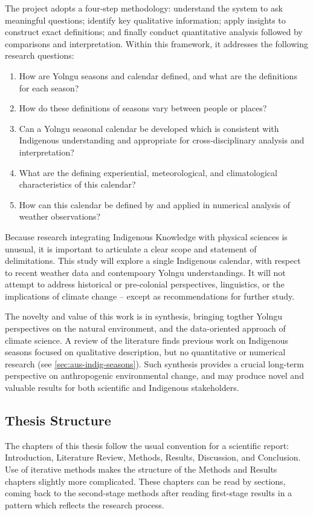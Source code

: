 The project adopts a four-step methodology:  understand the system to ask
meaningful questions; identify key qualitative information; apply insights to
construct exact definitions; and finally conduct quantitative analysis
followed by comparisons and interpretation.  Within this framework, it
addresses the following research questions:
\begin{enumerate}
\item How are Yolngu seasons and calendar defined, and what are the definitions for each season?
\item How do these definitions of seasons vary between people or places?
\item Can a Yolngu seasonal calendar be developed which is consistent with Indigenous
    understanding and appropriate for cross-disciplinary analysis and interpretation?
\item What are the defining experiential, meteorological, and climatological
    characteristics of this calendar?
\item How can this calendar be defined by and applied in numerical analysis of weather observations?
\end{enumerate}

Because research integrating Indigenous Knowledge with physical sciences is
unusual, it is important to articulate a clear scope and statement of delimitations.
This study will explore a single Indigenous calendar, with respect to recent weather data
and contempoary Yolngu understandings.  It will not attempt to address historical
or pre-colonial perspectives, linguistics, or the implications
of climate change -- except as recommendations for further study.

The novelty and value of this work is in synthesis, bringing
togther Yolngu perspectives on the natural environment, and the
data-oriented approach of climate science.  A review of the literature
finds previous work on Indigenous seasons focused on qualitative description, but
no quantitative or numerical research (see \cref{sec:aus-indig-seasons}).
Such synthesis provides a crucial long-term perspective on
anthropogenic environmental change, and may produce novel and valuable
results for both scientific and Indigenous stakeholders.


\clearpage
\subsection*{Thesis Structure}

The chapters of this thesis follow the usual convention for a scientific
report: Introduction, Literature Review, Methods, Results, Discussion,
and Conclusion.
%
Use of iterative methods makes the structure of the Methods and Results
chapters slightly more complicated.  These chapters can be read by sections,
coming back to the second-stage methods after reading first-stage results
in a pattern which reflects the research process.


